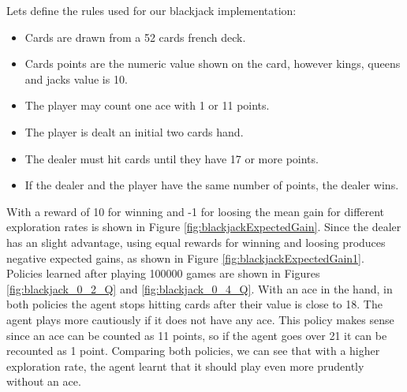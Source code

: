 \documentclass[12pt]{article}
\begin{document}
Lets define the rules used for our blackjack implementation:

\begin{itemize}
  \item Cards are drawn from a 52 cards french deck.
  \item Cards points are the numeric value shown on the card, however kings, queens and jacks value is 10.
  \item The player may count one ace with 1 or 11 points.
  \item The player is dealt an initial two cards hand.
  \item The dealer must hit cards until they have 17 or more points.
  \item If the dealer and the player have the same number of points, the dealer wins.
\end{itemize}

With a reward of 10 for winning and -1 for loosing the mean gain for different exploration rates is shown in  Figure \ref{fig:blackjackExpectedGain}.
Since the dealer has an slight advantage, using equal rewards for winning and loosing produces negative expected gains, as shown in Figure \ref{fig:blackjackExpectedGain1}.
Policies learned after playing 100000 games are shown in Figures \ref{fig:blackjack_0_2_Q} and \ref{fig:blackjack_0_4_Q}.
With an ace in the hand, in both policies the agent stops hitting cards after their value is close to 18.
The agent plays more cautiously if it does not have any ace.
This policy makes sense since an ace can be counted as 11 points, so if the agent goes over 21 it can be recounted as 1 point.
Comparing both policies, we can see that with a higher exploration rate, the agent learnt that it should play even more prudently without an ace.
\end{document}
